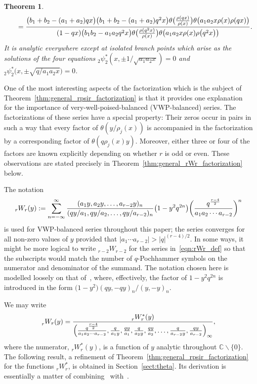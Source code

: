 \documentclass[10pt,a4paper]{amsart}
\numberwithin{equation}{section}
\newtheorem{Theorem}{Theorem}[section]
\newcommand{\C}{\mathbb{C}}
\begin{document}
\begin{Theorem}
\begin{gather}
\qquad= {\bigl(b_1+b_2-(a_1+a_2)qx\bigr) \bigl(b_1+b_2-(a_1+a_2)q^2x\bigr) \theta\bigl({\rho(qx) \over \rho(x)}\bigr) \theta\bigl(a_1a_2x\rho(x)\rho(qx)\bigr)\over (1-qx)\bigl(b_1b_2-a_1a_2q^2x\bigr) \theta\bigl({\rho(q^2x) \over \rho(x)}\bigr) \theta\bigl(a_1a_2x\rho(x)\rho\bigl(q^2x\bigr)\bigr)}. \label{eqn:rho_functional_equation}
\end{gather}
It is analytic everywhere except at isolated branch points which arise as the solutions of the four equations $_2^{}\psi_2^\ast(x,\pm 1/\sqrt{a_1a_2x})=0$ and $_2^{}\psi_2^\ast\bigl(x,\pm \sqrt{q/a_1a_2x}\bigr)=0$.
\end{Theorem}


One of the most interesting aspects of the factorization which is the subject of Theorem~\ref{thm:general_rpsir_factorization} is that it provides one explanation for the importance of very-well-poised-balanced (VWP-balanced) series. The factorizations of these series have a special property: Their zeros occur in pairs in such a way that every factor of $\theta(y/\rho_j(x))$ is accompanied in the factorization by a corresponding factor of $\theta(q\rho_j(x)y)$. Moreover, either three or four of the factors are known explicitly depending on whether $r$ is odd or even. These observations are stated precisely in Theorem~\ref{thm:general_rWr_factorization} below.

The notation
\begin{equation} \label{eqn:rWr_def}
_rW_r(y) := \sum_{n=-\infty}^\infty {(a_1 y, a_2 y, \dots, a_{r-2} y)_n \over (qy/a_1, qy/a_2, \dots, qy/a_{r-2})_n} \bigl(1-y^2q^{2n}\bigr) \bigg({q^{r-4 \over 2} \over a_1a_2 \cdots a_{r-2}}\bigg)^{ n}
\end{equation}
is used for VWP-balanced series throughout this paper; the series converges for all non-zero values of $y$ provided that $|a_1\cdots a_{r-2}|>|q|^{(r-4)/2}$. In some ways, it might be more logical to write $_{r-2}W_{r-2}$ for the series in~\eqref{eqn:rWr_def} so that the subscripts would match the number of $q$-Pochhammer symbols on the numerator and denominator of the summand. The notation chosen here is modelled loosely on that of~\cite[Section~2.1]{Gasper2004}, where, effectively, the factor of $1-y^2q^{2n}$ is introduced in the form $\bigl(1-y^2\bigr)(qy,-qy)_n/(y,-y)_n$.

We may write
\begin{equation} \label{eqn:rWrast_def}
_r^{}W_r(y) = {_r^{}W_r^\ast(y) \over \Bigl({q^{r-4 \over 2} \over a_1a_2\cdots a_{r-2}}, {q \over a_1 y}, {qy \over a_1}, {q \over a_2 y}, {qy \over a_2}, \dots, {q \over a_{r-2} y}, {qy \over a_{r-2}}\Bigr)_{ \infty}},
\end{equation}
where the numerator, $_r^{}W_r^\ast(y)$, is a function of $y$ analytic throughout $\C \backslash \{0\}$. The following result, a refinement of Theorem~\ref{thm:general_rpsir_factorization} for the functions $_r^{}W_r^\ast$, is obtained in Section~\ref{sect:theta}. Its derivation is essentially a matter of combining~\cite[Lemma~4.5]{Ito2008} with~\cite[Proposition~3.4]{Rosengren2006}.
\end{document}
